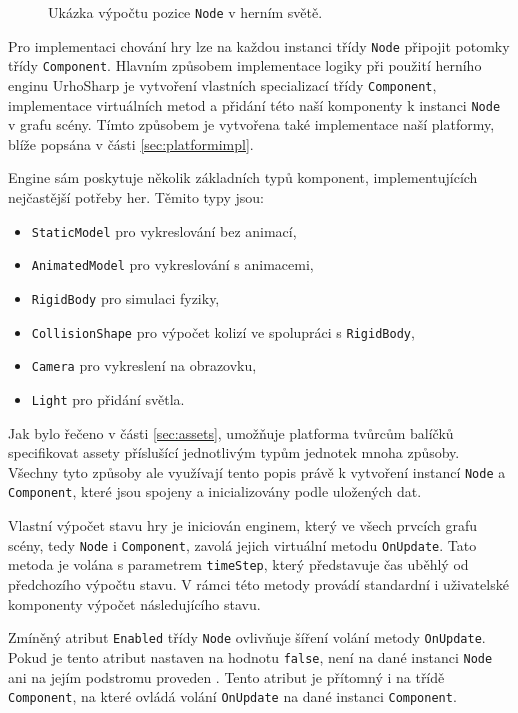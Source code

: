 \begin{figure}[h]
	\centering
	\fontsize{8pt}{11pt}\selectfont
	\def\svgwidth{\textwidth}
	
	\caption{Ukázka výpočtu pozice \texttt{Node} v herním světě.}
	\label{fig:relativeposition}
\end{figure}

Pro implementaci chování hry lze na každou instanci třídy \texttt{Node} připojit potomky třídy \texttt{Component}. Hlavním způsobem implementace logiky při použití herního enginu UrhoSharp je vytvoření vlastních specializací třídy \texttt{Component}, implementace virtuálních metod a přidání této naší komponenty k instanci \texttt{Node} v grafu scény. Tímto způsobem je vytvořena také implementace naší platformy, blíže popsána v části \ref{sec:platformimpl}. 

Engine sám poskytuje několik základních typů komponent, implementujících nejčastější potřeby her. Těmito typy jsou:

\begin{itemize}
	\item \texttt{StaticModel} pro vykreslování bez animací,
	\item \texttt{AnimatedModel} pro vykreslování s animacemi,
	\item \texttt{RigidBody} pro simulaci fyziky,
	\item \texttt{CollisionShape} pro výpočet kolizí ve spolupráci s \texttt{RigidBody},
	\item \texttt{Camera} pro vykreslení na obrazovku,
	\item \texttt{Light} pro přidání světla.
\end{itemize}

Jak bylo řečeno v části \ref{sec:assets}, umožňuje platforma tvůrcům balíčků specifikovat assety příslušící jednotlivým typům jednotek mnoha způsoby. Všechny tyto způsoby ale využívají tento popis právě k vytvoření instancí \texttt{Node} a \texttt{Component}, které jsou spojeny a inicializovány podle uložených dat. 

Vlastní výpočet stavu hry je iniciován enginem, který ve všech prvcích grafu scény, tedy \texttt{Node} i \texttt{Component}, zavolá jejich virtuální metodu \texttt{OnUpdate}. Tato metoda je volána s parametrem \texttt{timeStep}, který představuje čas uběhlý od předchozího výpočtu stavu. V rámci této metody provádí standardní i uživatelské komponenty výpočet následujícího stavu.

Zmíněný atribut \texttt{Enabled} třídy \texttt{Node} ovlivňuje šíření volání metody \texttt{OnUpdate}. Pokud je tento atribut nastaven na hodnotu \texttt{false}, není na dané instanci \texttt{Node} ani na jejím podstromu proveden . Tento atribut je přítomný i na třídě \texttt{Component}, na které ovládá volání \texttt{OnUpdate} na dané instanci \texttt{Component}.

